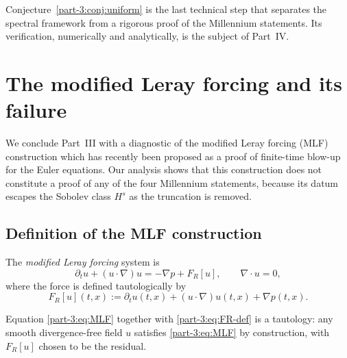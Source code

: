 \begin{remark}\label{part-3:rem:final-obstr}
Conjecture~\ref{part-3:conj:uniform} is the last technical step that 
separates the spectral framework from a rigorous proof of the 
Millennium statements. Its verification, numerically and 
analytically, is the subject of Part~IV.
\end{remark}

\section{The modified Leray forcing and its failure}
\label{part-3:sec:MLF}

We conclude Part~III with a diagnostic of the modified Leray forcing 
(MLF) construction which has recently been proposed as a proof of 
finite-time blow-up for the Euler equations. Our analysis shows that 
this construction does not constitute a proof of any of the four 
Millennium statements, because its datum escapes the Sobolev class 
$H^s$ as the truncation is removed.

\subsection{Definition of the MLF construction}
\label{part-3:ssec:MLF-def}

\begin{definition}\label{part-3:def:MLF}
The \emph{modified Leray forcing} system is
\begin{equation}\label{part-3:eq:MLF}
\partial_t u + (u\cdot\nabla)u = -\nabla p + F_R[u],
\qquad\nabla\cdot u = 0,
\end{equation}
where the force is defined tautologically by
\begin{equation}\label{part-3:eq:FR-def}
F_R[u](t,x) := \partial_t u(t,x) + (u\cdot\nabla)u(t,x) + \nabla p(t,x).
\end{equation}
\end{definition}

\begin{remark}[Tautology]\label{part-3:rem:tautology}
Equation \eqref{part-3:eq:MLF} together with \eqref{part-3:eq:FR-def} is a 
tautology: any smooth divergence-free field $u$ satisfies 
\eqref{part-3:eq:MLF} by construction, with $F_R[u]$ chosen to be the 
residual.
\end{remark}

